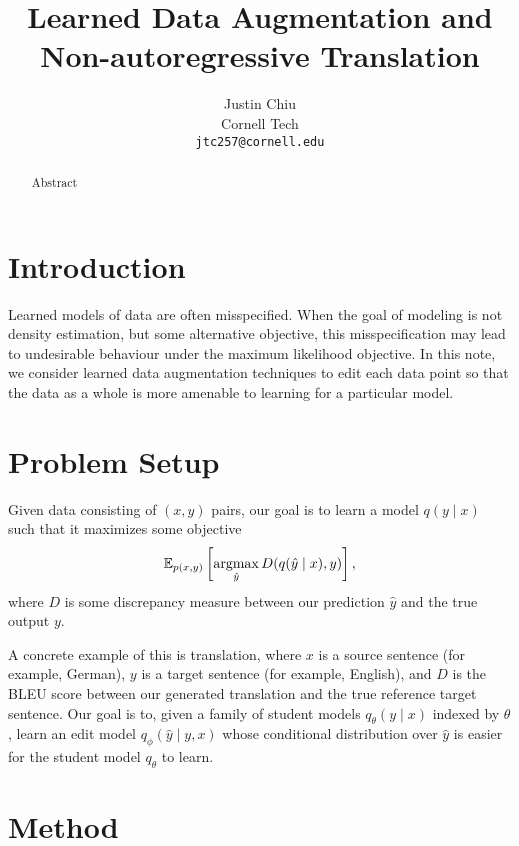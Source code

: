 \documentclass[11pt]{article}
\title{Learned Data Augmentation and Non-autoregressive Translation}
\author{Justin Chiu \\
  Cornell Tech \\
  \texttt{jtc257@cornell.edu}}
\begin{document}
\maketitle
\begin{abstract}
Abstract
\end{abstract}

\section{Introduction}
Learned models of data are often misspecified.
When the goal of modeling is not density estimation,
but some alternative objective, this misspecification may lead to undesirable
behaviour under the maximum likelihood objective.
In this note, we consider learned data augmentation techniques to edit
each data point so that the data as a whole is more amenable to learning for a particular model.

\section{Problem Setup}
Given data consisting of $(x,y)$ pairs, our goal is to learn a model $q(y \mid x)$
such that it maximizes some objective
\begin{equation}
    \mathbb{E}_{p(x,y)}\left[\operatorname*{argmax}_{\hat{y}}D(q(\hat{y} \mid x), y)\right],
\end{equation}
where $D$ is some discrepancy measure between our prediction $\hat{y}$ and the true output $y$.

A concrete example of this is translation, where $x$ is a source sentence (for example, German),
$y$ is a target sentence (for example, English),
and $D$ is the BLEU score between our generated translation and the true
reference target sentence.
Our goal is to, given a family of student models $q_\theta(y \mid x)$ indexed by $\theta$,
learn an edit model $q_\phi(\hat{y} \mid y, x)$ whose conditional distribution over $\hat{y}$
is easier for the student model $q_\theta$ to learn.

\section{Method}



\end{document}
